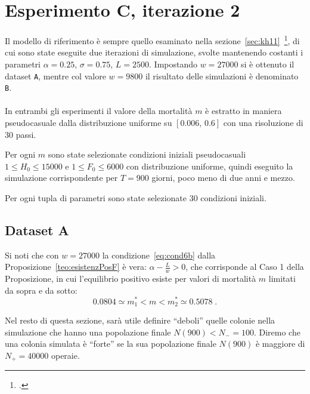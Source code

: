 \section{Esperimento C, iterazione 2}
Il modello di riferimento è sempre quello esaminato nella sezione~\ref{sec:kh11}~\footcite{khoury2011},
di cui sono state eseguite
due iterazioni di simulazione, svolte mantenendo costanti i parametri $\alpha = 0.25$, $\sigma=0.75$,
$L=2500$.
Impostando $w=27000$ si è ottenuto il dataset \texttt{A}, mentre col valore
$w=9800$ il risultato delle simulazioni è denominato \texttt{B}.

\paragraph{}
In entrambi gli esperimenti il valore della mortalità $m$ è estratto in maniera pseudocasuale dalla distribuzione
uniforme su $[0.006, \, 0.6]$
con una risoluzione di 30 passi.

Per ogni $m$ sono state selezionate condizioni iniziali pseudocasuali $1 \leq H_0 \leq 15000$ e
$1 \leq F_0 \leq 6000$ con distribuzione uniforme, quindi eseguito la simulazione corrispondente per $T=900$ giorni, poco meno di due anni e mezzo.

Per ogni tupla di parametri sono state selezionate 30 condizioni iniziali.

\subsection{Dataset A}
\label{sec:kh11expC2A}
Si noti che con $w=27000$ la condizione~\eqref{eq:cond6b} dalla Proposizione~\ref{teo:esistenzPosF} è vera:
$\alpha - \frac{L}{w} > 0$, che corrisponde al Caso 1 della Proposizione,
in cui l'equilibrio positivo esiste per valori di mortalità $m$ limitati da sopra e da sotto:
$$ 0.0804 \simeq m_1^* < m < m_2^* \simeq 0.5078 \; .$$

Nel resto di questa sezione, sarà utile definire ``deboli'' quelle colonie nella simulazione che hanno
una popolazione finale $N(900) < N_- = 100$.
Diremo che una colonia simulata è ``forte'' se la sua popolazione finale $N(900)$
è maggiore di $N_+ = 40000$ operaie.

